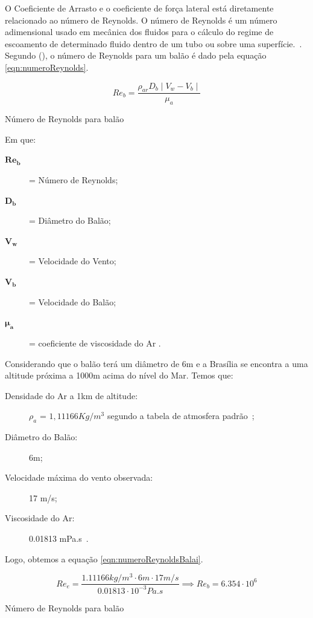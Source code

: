 	O Coeficiente de Arrasto e o coeficiente de força lateral está diretamente relacionado ao número de Reynolds. O número de Reynolds é um número adimensional usado em mecânica dos fluidos para o cálculo do regime de escoamento de determinado fluido dentro de um tubo ou sobre uma superfície.~\cite{bird}. Segundo  (\citeyear{yajima}), o número de Reynolds para um balão é dado pela equação \eqref{eqn:numeroReynolds}.

	\begin{equacao}
		\begin{equation}
			Re_{b} = \frac{\rho_{ar} D_{b} \mid V_{w} - V_{b} \mid}{\mu_{a}}
		\end{equation}
		\caption{Número de Reynolds para balão}
		\label{eqn:numeroReynolds}
	\end{equacao}

	Em que:
	\begin{description}
		\item[$\boldsymbol{Re_{b}}$] = Número de Reynolds;
		\item[$\boldsymbol{D_{b}}$] = Diâmetro do Balão;
		\item[$\boldsymbol{V_{w}}$] = Velocidade do Vento;
		\item[$\boldsymbol{V_{b}}$] = Velocidade do Balão;
		\item[$\boldsymbol{\mu_{a}}$] = coeficiente de viscosidade do Ar .
	\end{description}

	Considerando que o balão terá um diâmetro de 6m e a Brasília se encontra a uma altitude próxima a 1000m acima do nível do Mar. Temos que:

	\begin{description}
		\item[Densidade do Ar a 1km de altitude:] $\rho_{a}$ = $1,11166 Kg/m^3$ segundo a tabela de atmosfera padrão~\cite{bird};
		\item[Diâmetro do Balão:] 6m;
		\item[Velocidade máxima do vento observada:] 17 m/s;
		\item[Viscosidade do Ar:] 0.01813 mPa.s~\cite{bird}.
	\end{description}

	Logo, obtemos a equação \eqref{eqn:numeroReynoldsBalai}.

	\begin{equacao}
		\begin{equation}
			Re_{e} = \frac{1.11166 kg/m^3 \cdot 6m \cdot 17 m/s}{0.01813 \cdot 10^{-3} Pa.s} \implies Re_{b} = 6.354 \cdot 10^6
		\end{equation}
		\caption{Número de Reynolds para balão}
		\label{eqn:numeroReynoldsBalai}
	\end{equacao}

